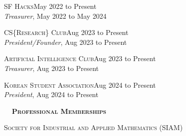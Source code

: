\documentclass[hidelinks, 10.5pt]{article}
\def\contentwidth{0.9\linewidth}    %
\def\contentblockspacing{2.5mm}     %
\def\sectionspacing{8mm}            %
\def\sectiontocontentspacing{4mm}   %
\renewcommand{\section}[1]{
    {\fontsize{14}{14}\selectfont \textsc{\textbf{\ \ #1\ \ }}}\hrulefill
}
\begin{document}
{\vspace{\contentblockspacing}

\begin{minipage}[ct]{\contentwidth}
    \textsc{SF Hacks}\hfill May 2022 to Present\\
    \emph{Treasurer}, May 2022 to May 2024
\end{minipage}

\vspace{\contentblockspacing}

\begin{minipage}[ct]{\contentwidth}
    \textsc{CS}\{\textsc{Research}\}\textsc{ Club}\hfill Aug 2023 to Present\\
    \emph{President/Founder}, Aug 2023 to Present
\end{minipage}

\vspace{\contentblockspacing}

\begin{minipage}[ct]{\contentwidth}
    \textsc{Artificial Intelligence Club}\hfill Aug 2023 to Present\\
    \emph{Treasurer}, Aug 2023 to Present
\end{minipage}

\vspace{\contentblockspacing}

\begin{minipage}[ct]{\contentwidth}
    \textsc{Korean Student Association}\hfill Aug 2024 to Present\\
    \emph{President}, Aug 2024 to Present
\end{minipage}

\vspace{\sectionspacing}


\section{Professional Memberships}

\vspace{\sectiontocontentspacing}

\begin{minipage}[ct]{\contentwidth}
    \textsc{Society for Industrial and Applied Mathematics} (SIAM)
\end{minipage}

}
\end{document}
